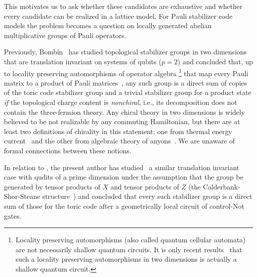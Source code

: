 \documentclass[aps,pra,
floatfix,notitlepage,
nofootinbib,
longbibliography,11pt]{revtex4-1}
\theoremstyle{definition}
\begin{document}
\noindent
This motivates us to ask whether these candidates are exhaustive
and whether every candidate can be realized in a lattice model.
For Pauli stabilizer code models the problem becomes 
a question on locally generated abelian multiplicative groups of Pauli operators.

Previously,
Bomb\'in~\cite{Bombin2011Structure} has studied topological stabilizer groups in two dimensions 
that are translation invariant
on systems of qubits ($p=2$) and concluded that, 
up to locality preserving automorphisms of operator algebra%
\footnote{
Locality preserving automorphisms (also called quantum cellular automata)
are not necessarily shallow quantum circuits.
It is only recent results~\cite{FreedmanHastings,haah2019clifford}
that such a locality preserving automorphisms in two dimensions is actually a shallow quantum circuit.
} 
that map every Pauli matrix to a product of Pauli matrices~\cite{clifQCA,haah2019clifford},
any such group is a direct sum of copies of the toric code stabilizer group
and a trivial stabilizer group for a product state 
\emph{if} the topological charge content is \emph{nonchiral},
i.e., its decomposition does not contain the three-fermion theory.
Any chiral theory in two dimensions is widely believed to be not realizable by
any commuting Hamiltonian,
but there are at least two definitions of chirality in this statement:
one from thermal energy current~\cite[App.D]{Kitaev_2005} 
and the other from algebraic theory of anyons~\cite[cf.Prop.6.20]{FroehlichGabbiani}.
We are unaware of formal connections between these notions.

In relation to \cite{Bombin2011Structure}, 
the present author has studied~\cite{Haah2016} a similar translation invariant case with qudits of a prime dimension
under the assumption that the group be generated by tensor products of $X$ and tensor products of $Z$ 
(the Calderbank-Shor-Steane structure~\cite{CalderbankShor1996Good,Steane1996Multiple})
and concluded that every such stabilizer group is a direct sum of those for the toric code
after a geometrically local circuit of control-Not gates.
\end{document}
